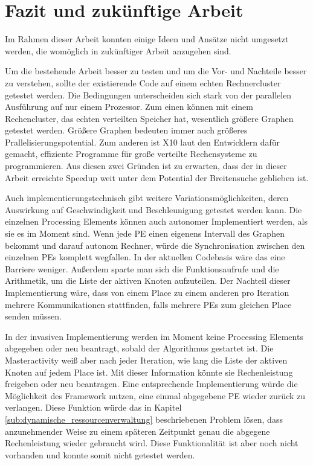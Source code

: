 \chapter{Fazit und zukünftige Arbeit} %
\label{cha:fazit_und_zuk_nftige_arbeit}

Im Rahmen dieser Arbeit konnten einige Ideen und Ansätze nicht umgesetzt werden, die womöglich in zukünftiger Arbeit anzugehen sind.

Um die bestehende Arbeit besser zu testen und um die Vor- und Nachteile besser zu verstehen, sollte der existierende Code auf einem echten Rechnercluster getestet werden. Die Bedingungen unterscheiden sich stark von der parallelen Ausführung auf nur einem Prozessor. Zum einen können mit einem Rechencluster, das echten verteilten Speicher hat, wesentlich größere Graphen getestet werden. Größere Graphen bedeuten immer auch größeres Prallelisierungspotential. Zum anderen ist X10 laut den Entwicklern dafür gemacht, effiziente Programme für große verteilte Rechensysteme zu programmieren. Aus diesen zwei Gründen ist zu erwarten, dass der in dieser Arbeit erreichte Speedup weit unter dem Potential der Breitensuche geblieben ist. 

Auch implementierungstechnisch gibt weitere Variationsmöglichkeiten, deren Auswirkung auf Geschwindigkeit und Beschleunigung getestet werden kann. Die einzelnen Processing Elements können auch autonomer Implementiert werden, als sie es im Moment sind. Wenn jede PE einen eigenens Intervall des Graphen bekommt und darauf autonom Rechner, würde die Synchronisation zwischen den einzelnen PEs komplett wegfallen. In der aktuellen Codebasis wäre das eine Barriere weniger. Außerdem sparte man sich die Funktionsaufrufe und die Arithmetik, um die Liste der aktiven Knoten aufzuteilen. Der Nachteil dieser Implementierung wäre, dass von einem Place zu einem anderen pro Iteration mehrere Kommunikationen stattfinden, falls mehrere PEs zum gleichen Place senden müssen. 

In der invasiven Implementierung werden im Moment keine Processing Elements abgegeben oder neu beantragt, sobald der Algorithmus gestartet ist. Die Masteractivity weiß aber nach jeder Iteration, wie lang die Liste der aktiven Knoten auf jedem Place ist. Mit dieser Information könnte sie Rechenleistung freigeben oder neu beantragen. Eine entsprechende Implementierung würde die Möglichkeit des Framework nutzen, eine einmal abgegebene PE wieder zurück zu verlangen. Diese Funktion würde das in Kapitel \ref{sub:dynamische_ressourcenverwaltung} beschriebenen Problem lösen, dass anzunehmender Weise zu einem späteren Zeitpunkt genau die abgegene Rechenleistung wieder gebraucht wird. Diese Funktionalität ist aber noch nicht vorhanden und konnte somit nicht getestet werden. 

